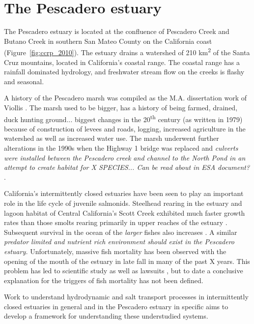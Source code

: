 \chapter{The Pescadero estuary} \label{chPescadero}

The Pescadero estuary is located at the confluence of Pescadero Creek and Butano Creek in southern San Mateo County on the California coast (Figure~\ref{fig:ccrp_2010}). The estuary drains a watershed of 210 km\textsuperscript{2} of the Santa Cruz mountains, located in California's coastal range. The coastal range has a rainfall dominated hydrology, and freshwater stream flow on the creeks is flashy and seasonal.



A history of the Pescadero marsh was compiled as the M.A. dissertation work of Viollis \parencite*{viollis_evolution_1979}. The marsh used to be bigger, has a history of being farmed, drained, duck hunting ground... biggest changes in the 20\textsuperscript{th} century (as written in 1979) because of construction of levees and roads, logging, increased agriculture in the watershed as well as increased water use. The marsh underwent further alterations in the 1990s when the Highway 1 bridge was replaced and \emph{culverts were installed between the Pescadero creek and channel to the North Pond in an attempt to create habitat for X SPECIES... Can be read about in ESA document? \parencite{esa_pescadero-butano_2004}}.

California's intermittently closed estuaries have been seen to play an important role in the life cycle of juvenile salmonids. Steelhead rearing in the estuary and lagoon habitat of Central California's Scott Creek exhibited much faster growth rates than those smolts rearing primarily in upper reaches of the estuary \parencite{hayes_steelhead_2008}. Subsequent survival in the ocean of the \emph{larger} fishes also increases \parencite{bond_marine_2008}. A similar \emph{predator limited and nutrient rich environment should exist in the Pescadero estuary.} Unfortunately, massive fish mortality has been observed with the opening of the mouth of the estuary in late fall in many of the past X years. This problem has led to scientific study \parencite{sloan_ecological_2006, smith_inorganic_2009} as well as lawsuits \parencite{scheck_tiny_2012}, but to date a conclusive explanation for the triggers of fish mortality has not been defined. 

Work to understand hydrodynamic and salt transport processes in intermittently closed estuaries in general and in the Pescadero estuary in specific aims to develop a framework for understanding these understudied systems. 

